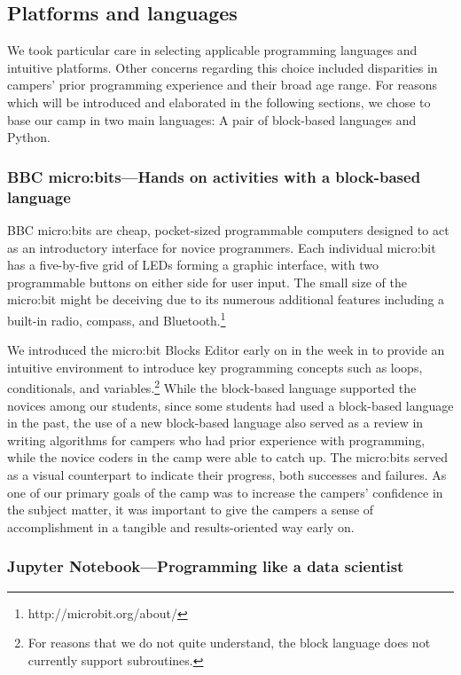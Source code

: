\subsection{Platforms and languages}

We took particular care in selecting applicable programming languages
and intuitive platforms. Other concerns regarding this choice
included disparities in campers' prior programming experience and
their broad age range. For reasons which will be introduced and
elaborated in the following sections, we chose to base our camp in
two main languages: A pair of block-based languages and Python.

\subsubsection{BBC micro:bits---Hands on activities with a block-based language}

BBC micro:bits are cheap, pocket-sized programmable computers
designed to act as an introductory interface for novice programmers.
Each individual micro:bit has a five-by-five grid of LEDs forming
a graphic interface, with two programmable buttons on either side
for user input.  The small size of the micro:bit might be deceiving
due to its numerous additional features including a built-in radio,
compass, and Bluetooth.\footnote{http://microbit.org/about/}

We introduced the micro:bit Blocks Editor early on in the week in
to provide an intuitive environment to introduce key programming
concepts such as loops, conditionals, and variables.\footnote{For
reasons that we do not quite understand, the block language does
not currently support subroutines.} While the block-based language
supported the novices among our students, since some students had
used a block-based language in the past, the use of a new block-based
language also served as a review in writing algorithms for campers
who had prior experience with programming, while the novice coders
in the camp were able to catch up. The micro:bits served as a visual
counterpart to indicate their progress, both successes and failures.
As one of our primary goals of the camp was to increase the campers'
confidence in the subject matter, it was important to give the
campers a sense of accomplishment in a tangible and results-oriented
way early on.

\subsubsection{Jupyter Notebook---Programming like a data scientist}

